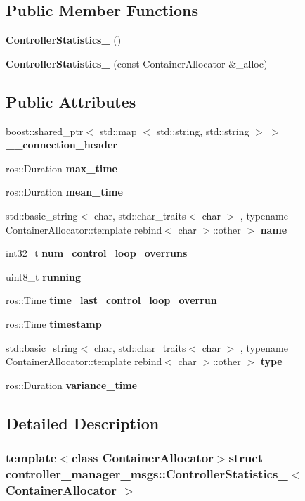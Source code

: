 \subsection*{\-Public \-Member \-Functions}
\begin{DoxyCompactItemize}
\item 
{\bf \-Controller\-Statistics\-\_\-} ()
\item 
{\bf \-Controller\-Statistics\-\_\-} (const \-Container\-Allocator \&\-\_\-alloc)
\end{DoxyCompactItemize}
\subsection*{\-Public \-Attributes}
\begin{DoxyCompactItemize}
\item 
boost\-::shared\-\_\-ptr$<$ std\-::map\*
$<$ std\-::string, std\-::string $>$ $>$ {\bf \-\_\-\-\_\-connection\-\_\-header}
\item 
ros\-::\-Duration {\bf max\-\_\-time}
\item 
ros\-::\-Duration {\bf mean\-\_\-time}
\item 
std\-::basic\-\_\-string$<$ char, \*
std\-::char\-\_\-traits$<$ char $>$\*
, typename \*
\-Container\-Allocator\-::template \*
rebind$<$ char $>$\-::other $>$ {\bf name}
\item 
int32\-\_\-t {\bf num\-\_\-control\-\_\-loop\-\_\-overruns}
\item 
uint8\-\_\-t {\bf running}
\item 
ros\-::\-Time {\bf time\-\_\-last\-\_\-control\-\_\-loop\-\_\-overrun}
\item 
ros\-::\-Time {\bf timestamp}
\item 
std\-::basic\-\_\-string$<$ char, \*
std\-::char\-\_\-traits$<$ char $>$\*
, typename \*
\-Container\-Allocator\-::template \*
rebind$<$ char $>$\-::other $>$ {\bf type}
\item 
ros\-::\-Duration {\bf variance\-\_\-time}
\end{DoxyCompactItemize}


\subsection{\-Detailed \-Description}
\subsubsection*{template$<$class Container\-Allocator$>$struct controller\-\_\-manager\-\_\-msgs\-::\-Controller\-Statistics\-\_\-$<$ Container\-Allocator $>$}



